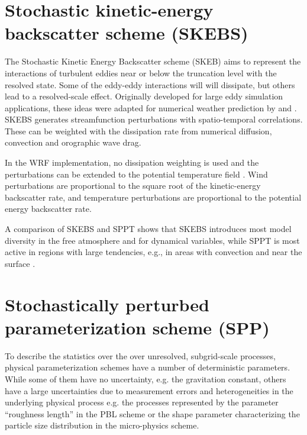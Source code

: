\section{Stochastic kinetic-energy backscatter scheme (SKEBS)}
The Stochastic Kinetic Energy Backscatter scheme (SKEB) aims to represent
the interactions of turbulent eddies near or below the
truncation level with the resolved state. Some of the eddy-eddy interactions will
will dissipate, but others lead to a resolved-scale effect.
Originally developed for large eddy simulation applications, these ideas were 
adapted for numerical weather prediction by
\citet{Sh05} and \citet{Be09}.
SKEBS generates streamfunction perturbations with spatio-temporal correlations. These
can be weighted with the dissipation rate from numerical diffusion, convection and orographic 
wave drag. 

In the WRF implementation, no dissipation weighting is used and the 
perturbations can be extended to the potential temperature field \citep{Be11}.
Wind perturbations are proportional to the square
root of the kinetic-energy backscatter rate, and temperature
perturbations are proportional to the potential energy backscatter rate.

A comparison of SKEBS and SPPT shows that SKEBS introduces most model diversity in the 
free atmosphere and for dynamical variables, 
while SPPT is most active in regions with large tendencies, e.g., in areas with convection 
and near the surface \citep{Be15}.
\section {Stochastically perturbed parameterization scheme (SPP)}
To describe the statistics over the over unresolved, subgrid-scale processes, 
physical parameterization schemes have a number of deterministic parameters.
While some of them have no uncertainty, e.g. the gravitation constant, 
others have a large uncertainties due to 
measurement errors and heterogeneities in the underlying physical process
e.g. the processes represented by the parameter ``roughness length'' in the PBL scheme or
the shape parameter characterizing the particle size distribution in the micro-physics 
scheme.  

